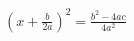 \documentclass[preview]{standalone}
\begin{document}
\begin{center}
$\left( x + \frac{b}{2a} \right)^2 = \frac{b^2 - 4ac}{4a^2}$
\end{center}
\end{document}
